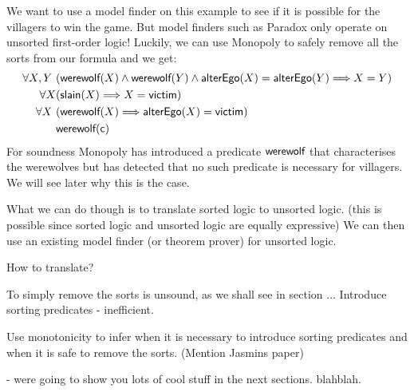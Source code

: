 We want to use a model finder on this example to see if it is possible
for the villagers to win the game. But model finders such as Paradox
only operate on unsorted first-order logic! Luckily, we can use
Monopoly to safely remove all the sorts from our formula and we get:
\begin{align*}
\forall X, Y \ & ( \mbox {\sf werewolf}(X) \land \mbox {\sf werewolf}(Y) \land \mbox {\sf alterEgo}(X) = \mbox {\sf alterEgo}(Y) \Longrightarrow X = Y) \\
\forall X & (\mbox {\sf slain}(X) \Longrightarrow X = \mbox{\sf victim}) \\
\forall X \ & (\mbox {\sf werewolf}(X) \Longrightarrow \mbox {\sf alterEgo}(X) = \mbox{\sf victim}) \\
& \mbox {\sf werewolf}(\mbox{\sf c})
\end{align*}
For soundness Monopoly has introduced a predicate $\mbox {\sf werewolf}$ that
characterises the werewolves but has detected that no such predicate
is necessary for villagers. We will see later why this is the case.

What we can do though is to translate sorted logic to unsorted logic. 
(this is possible since sorted logic and unsorted logic are equally expressive) 
We can then use an existing model finder (or theorem prover) for unsorted logic.

How to translate?

To simply remove the sorts is unsound, as we shall see in section ...
Introduce sorting predicates - inefficient.

Use monotonicity to infer when it is necessary to introduce sorting predicates
and when it is safe to remove the sorts. (Mention Jasmins paper)

- were going to show you lots of cool stuff in the next sections. blahblah.













